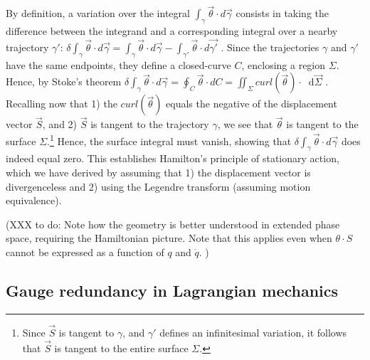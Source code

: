 \documentclass[letterpaper]{article}
\newcommand{\diff}{\mathop{}\!\mathrm{d}} %
\renewcommand{\vector}[1]{\ensuremath{\vec{#1}}} %
\newcommand{\integral}{\int}
\begin{document}
By definition, a variation over the integral $\integral_{\gamma} \vector{\theta} \cdot d\vector{\gamma}$ consists in taking the difference between the integrand and a corresponding integral over a nearby trajectory $\gamma'$: $\delta \integral_{\gamma} \vector{\theta} \cdot d\vector{\gamma} = \integral_{\gamma} \vector{\theta} \cdot d\vector{\gamma} - \integral_{\gamma'} \vector{\theta} \cdot d\vector{\gamma'}$ . Since the trajectories $\gamma$ and $\gamma'$ have the same endpoints, they define a closed-curve $C$, enclosing a region $\Sigma $. Hence, by Stoke's theorem $\delta \integral_{\gamma} \vector{\theta} \cdot d\vector{\gamma} = \oint_{C} \vector{\theta}  \cdot dC = \iint_{\Sigma} curl(\vector{\theta}) \cdot \diff \vector{\Sigma}$ . Recalling now that 1) the $curl(\vector{\theta})$ equals the negative of the displacement vector $\vector{S}$, and 2)  $\vector{S}$ is tangent to the trajectory $\gamma $, we see that $\vector{\theta}$ is tangent to the surface $\Sigma $.\footnote{Since $\vector{S}$ is tangent to $\gamma $, and $\gamma'$ defines an infinitesimal variation, it follows that $\vector{S}$ is tangent to the entire surface $\Sigma $.} Hence, the surface integral must vanish, showing that $\delta \integral_{\gamma} \vector{\theta} \cdot d\vector{\gamma}$ does indeed equal zero. This establishes Hamilton's principle of stationary action, which we have derived by assuming that 1) the displacement vector is divergenceless and 2) using the Legendre transform (assuming motion equivalence).

(XXX to do: Note how the geometry is better understood in extended phase space, requiring the Hamiltonian picture. Note that this applies even when $\theta \cdot S$ cannot be expressed as a function of $q$ and $\dot q$. )


\subsection{Gauge redundancy in Lagrangian mechanics}
\label{gauge}
\end{document}
